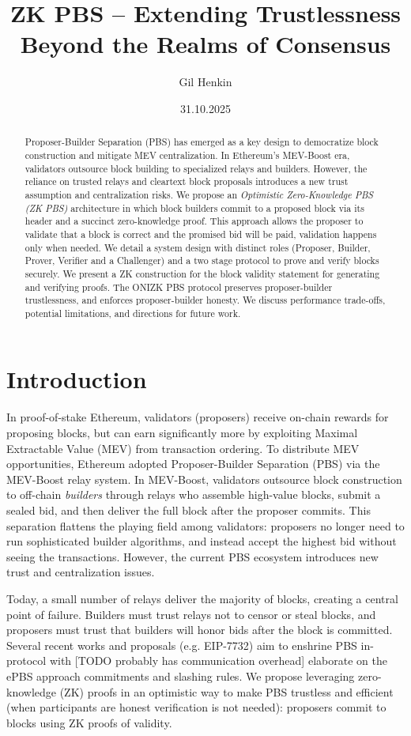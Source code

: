\documentclass[11pt]{article}
\title{ZK PBS – Extending Trustlessness Beyond the Realms of Consensus}
\author{Gil Henkin}
\date{31.10.2025}
\begin{document}
\maketitle

\begin{abstract}
Proposer-Builder Separation (PBS) has emerged as a key design to democratize block construction and mitigate MEV centralization.  In Ethereum’s MEV-Boost era, validators outsource block building to specialized relays and builders.  However, the reliance on trusted relays and cleartext block proposals introduces a new trust assumption and centralization risks.
We propose an \emph{Optimistic Zero-Knowledge PBS (ZK PBS)} architecture in which block builders commit to a proposed block via its header and a succinct zero-knowledge proof.  This approach allows the proposer to validate that a block is correct and the promised bid will be paid, validation happens only when needed.  We detail a system design with distinct roles (Proposer, Builder, Prover, Verifier and a Challenger) and a two stage protocol to prove and verify blocks securely.  We present a ZK construction for the block validity statement for generating and verifying proofs. The ONIZK PBS protocol preserves proposer-builder trustlessness, and enforces proposer-builder honesty.  We discuss performance trade-offs, potential limitations, and directions for future work. 
\end{abstract}

\section{Introduction}
In proof-of-stake Ethereum, validators (proposers) receive on-chain rewards for proposing blocks, but can earn significantly more by exploiting Maximal Extractable Value (MEV) from transaction ordering.  To distribute MEV opportunities, Ethereum adopted Proposer-Builder Separation (PBS) via the MEV-Boost relay system.  In MEV-Boost, validators outsource block construction to off-chain \emph{builders}  through relays who assemble high-value blocks, submit a sealed bid, and then deliver the full block after the proposer commits.  This separation flattens the playing field among validators: proposers no longer need to run sophisticated builder algorithms, and instead accept the highest bid without seeing the transactions.  However, the current PBS ecosystem introduces new trust and centralization issues.

Today, a small number of relays deliver the majority of blocks, creating a central point of failure.  Builders must trust relays not to censor or steal blocks, and proposers must trust that builders will honor bids after the block is committed.  Several recent works and proposals (e.g. EIP-7732) aim to enshrine PBS in-protocol with  [TODO probably has communication overhead] elaborate on the ePBS approach commitments and slashing rules.  We propose leveraging zero-knowledge (ZK) proofs in an optimistic way to make PBS trustless and efficient (when participants are honest verification is not needed): proposers commit to blocks using ZK proofs of validity. 
\end{document}
